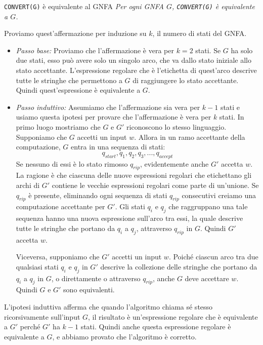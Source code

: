 \begin{Thm}{\texttt{CONVERT(G)} è equivalente al GNFA}{}
\textit{Per ogni GNFA $G$, \texttt{CONVERT(G)} è equivalente a $G$.}

Proviamo quest'affermazione per induzione su $k$, il numero di stati del GNFA.

\begin{demonstration}\phantom{}

\begin{itemize}
    \item \textit{Passo base:} Proviamo che l'affermazione è vera per $k = 2$ stati. Se $G$ ha solo due stati, esso può avere solo un singolo arco, che va dallo stato iniziale allo stato accettante. L'espressione regolare che è l'etichetta di quest'arco descrive tutte le stringhe che permettono a $G$ di raggiungere lo stato accettante. Quindi quest'espressione è equivalente a $G$.
    \item \textit{Passo induttivo:} Assumiamo che l'affermazione sia vera per $k - 1$ stati e usiamo questa ipotesi per provare che l'affermazione è vera per $k$ stati. In primo luogo mostriamo che $G$ e $G'$ riconoscono lo stesso linguaggio. Supponiamo che $G$ accetti un input $w$. Allora in un ramo accettante della computazione, $G$ entra in una sequenza di stati:
    \begin{equation*}
        q_{start},q_1,q_2,q_3,...,q_{accept}
    \end{equation*}
    Se nessuno di essi è lo stato rimosso $q_{rip}$, evidentemente anche $G'$ accetta $w$. La ragione è che ciascuna delle nuove espressioni regolari che etichettano gli archi di $G'$ contiene le vecchie espressioni regolari come parte di un'unione. Se $q_{rip}$ è presente, eliminando ogni sequenza di stati $q_{rip}$ consecutivi creiamo una computazione accettante per $G'$. Gli stati $q_{i}$ e $q_{j}$ che raggruppano una tale sequenza hanno una nuova espressione sull'arco tra essi, la quale descrive tutte le stringhe che portano da $q_i$ a $q_j$, attraverso $q_{rip}$ in $G$. Quindi $G'$ accetta $w$.

    Viceversa, supponiamo che $G'$ accetti un input $w$. Poiché ciascun arco tra due qualsiasi stati $q_i$ e $q_j$ in $G'$ descrive la collezione delle stringhe che portano da $q_i$ a $q_j$ in $G$, o direttamente o attraverso $q_{rip}$, anche $G$ deve accettare $w$. Quindi $G$ e $G'$ sono equivalenti.
\end{itemize}

L'ipotesi induttiva afferma che quando l'algoritmo chiama sé stesso ricorsivamente sull'input $G$, il risultato è un'espressione regolare che è equivalente a $G'$ perché $G'$ ha $k-1$ stati. Quindi anche questa espressione regolare è equivalente a $G$, e abbiamo provato che l'algoritmo è corretto.
\end{demonstration}
\end{Thm}


